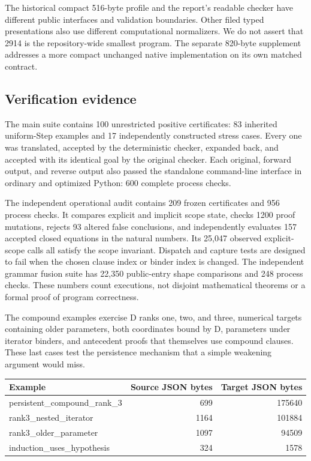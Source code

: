 \documentclass[11pt,letterpaper]{article}
\theoremstyle{definition}
\begin{document}
The historical compact 516-byte profile and the report's readable
checker have different public interfaces and validation boundaries.
Other filed typed presentations also use different computational
normalizers. We do not assert that 2914 is the repository-wide smallest
program. The separate 820-byte supplement addresses a more compact
unchanged native implementation on its own matched contract.

\subsection{Verification evidence}

The main suite contains 100 unrestricted positive certificates: 83
inherited uniform-Step examples and 17 independently constructed stress
cases. Every one was translated, accepted by the deterministic checker,
expanded back, and accepted with its identical goal by the original
checker. Each original, forward output, and reverse output also passed
the standalone command-line interface in ordinary and optimized Python:
600 complete process checks.

The independent operational audit contains 209 frozen certificates and
956 process checks. It compares explicit and implicit scope state,
checks 1200 proof mutations, rejects 93 altered false conclusions,
and independently evaluates 157 accepted closed equations in the natural
numbers. Its 25,047 observed explicit-scope calls all satisfy the scope
invariant. Dispatch and capture tests are designed to fail when the
chosen clause index or binder index is changed. The independent grammar
fusion suite has 22,350 public-entry shape comparisons and 248 process
checks. These numbers count executions, not disjoint mathematical
theorems or a formal proof of program correctness.

The compound examples exercise D ranks one, two, and three, numerical
targets containing older parameters, both coordinates bound by D,
parameters under iterator binders, and antecedent proofs that themselves
use compound clauses. These last cases test the persistence mechanism
that a simple weakening argument would miss.

\begin{center}
\small
\begin{tabular}{lrr}
\toprule
Example & Source JSON bytes & Target JSON bytes\\
\midrule
persistent\_compound\_rank\_3 & 699 & 175640 \\
rank3\_nested\_iterator & 1164 & 101884 \\
rank3\_older\_parameter & 1097 & 94509 \\
induction\_uses\_hypothesis & 324 & 1578 \\
\bottomrule
\end{tabular}
\end{center}
\end{document}
